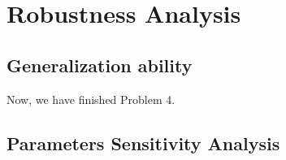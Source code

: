 \section{Robustness Analysis}

\subsection{Generalization ability}

Now, we have finished Problem 4.

\subsection{Parameters Sensitivity Analysis}